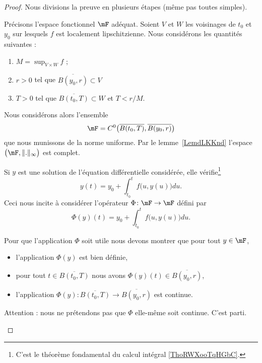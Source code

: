 \begin{proof}
	Nous divisions la preuve en plusieurs étapes (même pas toutes simples).
	\begin{subproof}

		Précisons l'espace fonctionnel \( \mF\) adéquat. Soient \( V\) et \( W\) les voisinages de \( t_0\) et \( y_0\) sur lesquels \( f\) est localement lipschitzienne. Nous considérons les quantités suivantes :
		\begin{enumerate}
			\item
			      \( M=\sup_{V\times W}f\) ;
			\item
			      \( r>0\) tel que \( \overline{ B(y_0,r) }\subset V\)
			\item
			      \( T>0\) tel que \( \overline{ B(t_0,T) }\subset W\) et \( T<r/M\).
		\end{enumerate}
		Nous considérons alors l'ensemble
		\begin{equation}
			\mF=C^0\big( \overline{ B(t_0,T) },\overline{ B(y_0,r) } \big)
		\end{equation}
		que nous munissons de la norme uniforme. Par le lemme~\ref{LemdLKKnd} l'espace \( \big( \mF,\| . \|_{\infty} \big)\) est complet.



		Si \( y\) est une solution de l'équation différentielle considérée, elle vérifie\footnote{C'est le théorème fondamental du calcul intégral \ref{ThoRWXooTqHGbC}.}
		\begin{equation}        \label{EqPGLwcL}
			y(t)=y_0+\int_{t_0}^tf\big( u,y(u) \big)du.
		\end{equation}
		Ceci nous incite à considérer l'opérateur \( \Phi\colon \mF\to \mF\) défini par
		\begin{equation}
			\Phi(y)(t)=y_0+\int_{t_0}^tf\big( u,y(u) \big)du.
		\end{equation}

		Pour que l'application \( \Phi\) soit utile nous devons montrer que pour tout \( y\in \mF\),
		\begin{itemize}
			\item l'application \( \Phi(y)\) est bien définie,
			\item pour tout \( t\in\overline{ B(t_0,T) }\) nous avons \( \Phi(y)(t)\in\overline{ B(y_0,r) }\),
			\item l'application \( \Phi(y)\colon  \overline{ B(t_0,T) } \to \overline{ B(y_0,r)}\) est continue.
		\end{itemize}
		Attention : nous ne prétendons pas que \( \Phi\) elle-même soit continue. C'est parti.
		\begin{subproof}


\end{subproof}
\end{subproof}
\end{proof}
